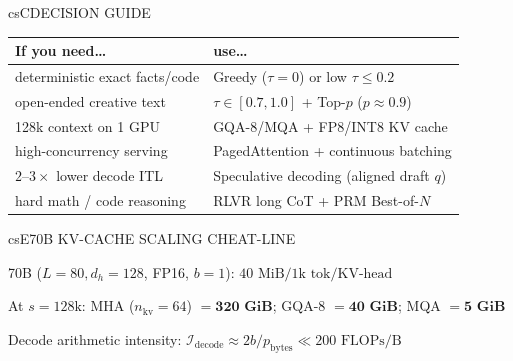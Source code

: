 \documentclass[../../../../master.tex]{subfiles}
\begin{document}
\begin{cscolumns}
\begin{cscard}{csC}{DECISION GUIDE}
  \renewcommand{\arraystretch}{1.22}\small
  \begin{tabular}{@{}>{\raggedright\arraybackslash}p{3.1cm}>{\raggedright\arraybackslash}p{4.6cm}@{}}
    \textbf{If you need\ldots} & \textbf{use\ldots}\\ \hline
    deterministic exact facts/code & Greedy ($\tau=0$) or low $\tau\le 0.2$\\
    open-ended creative text & $\tau\in[0.7,1.0]$ + Top-$p$ ($p\approx 0.9$)\\
    128k context on 1 GPU & GQA-8/MQA + FP8/INT8 KV cache\\
    high-concurrency serving & PagedAttention + continuous batching\\
    $2\text{--}3\times$ lower decode ITL & Speculative decoding (aligned draft $q$)\\
    hard math / code reasoning & RLVR long CoT + PRM Best-of-$N$\\
  \end{tabular}
\end{cscard}

\begin{cscard}{csE}{70B KV-CACHE SCALING CHEAT-LINE}
  \begin{csbul}
    \item 70B ($L=80, d_h=128$, FP16, $b=1$): $40\text{ MiB/1k tok/KV-head}$
    \item At $s=128\text{k}$: MHA ($n_{\mathrm{kv}}=64$) $= \mathbf{320\text{ GiB}}$; GQA-8 $= \mathbf{40\text{ GiB}}$; MQA $= \mathbf{5\text{ GiB}}$
    \item Decode arithmetic intensity: $\mathcal{I}_{\mathrm{decode}} \approx 2b/p_{\mathrm{bytes}} \ll 200\text{ FLOPs/B}$
  \end{csbul}
\end{cscard}


\end{cscolumns}
\end{document}
